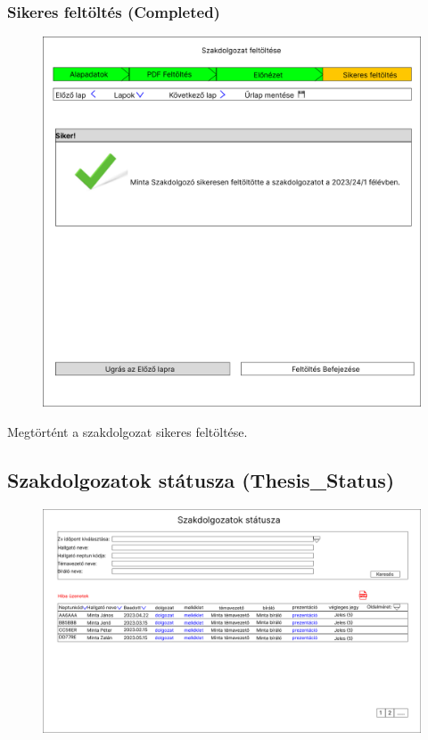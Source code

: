 \documentclass[a4paper,12pt]{article}
\begin{document}
\subsubsection{Sikeres feltöltés (Completed)}

\begin{figure}
	\centering
	\includegraphics[width=\textwidth]{images/Web_pages/Completed.jpg}
	\caption{}
	\label{fig:Completed}
\end{figure}

Megtörtént a szakdolgozat sikeres feltöltése.

\subsection{Szakdolgozatok státusza (Thesis\_Status)}

\begin{figure}
	\centering
	\includegraphics[width=\textwidth]{images/Web_pages/Thesis_Status.jpg}
	\caption{}
	\label{fig:Thesis_Status}
\end{figure}
\end{document}
